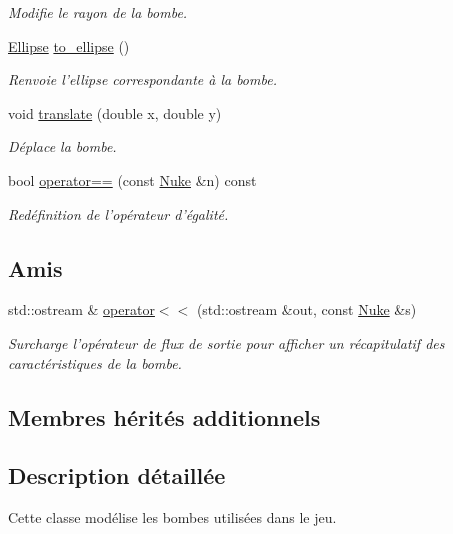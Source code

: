 \begin{DoxyCompactItemize}
\begin{DoxyCompactList}\small\item\em Modifie le rayon de la bombe. \end{DoxyCompactList}\item 
\hyperlink{classEllipse}{Ellipse} \hyperlink{classNuke_a69f5d44f026c6643a1e1460d2d3af685}{to\+\_\+ellipse} ()
\begin{DoxyCompactList}\small\item\em Renvoie l'ellipse correspondante à la bombe. \end{DoxyCompactList}\item 
void \hyperlink{classNuke_a9ee6013c36c9f905b562f5fc38b08cbe}{translate} (double x, double y)
\begin{DoxyCompactList}\small\item\em Déplace la bombe. \end{DoxyCompactList}\item 
bool \hyperlink{classNuke_a2fcd4953abc59fd87c641f6091579eab}{operator==} (const \hyperlink{classNuke}{Nuke} \&n) const 
\begin{DoxyCompactList}\small\item\em Redéfinition de l'opérateur d'égalité. \end{DoxyCompactList}\end{DoxyCompactItemize}
\subsection*{Amis}
\begin{DoxyCompactItemize}
\item 
std\+::ostream \& \hyperlink{classNuke_a9de8a2a72db7974fd22deac7ea5728a4}{operator$<$$<$} (std\+::ostream \&out, const \hyperlink{classNuke}{Nuke} \&s)
\begin{DoxyCompactList}\small\item\em Surcharge l'opérateur de flux de sortie pour afficher un récapitulatif des caractéristiques de la bombe. \end{DoxyCompactList}\end{DoxyCompactItemize}
\subsection*{Membres hérités additionnels}


\subsection{Description détaillée}
Cette classe modélise les bombes utilisées dans le jeu. 

